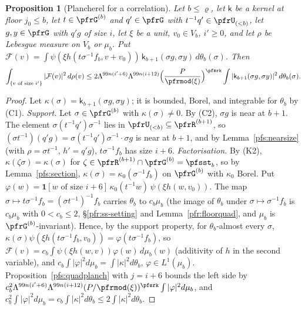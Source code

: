 \documentclass[10pt]{amsart}
\newtheorem{proposition}[theorem]{Proposition}
\theoremstyle{definition}
\theoremstyle{remark}
\begin{document}
\begin{proposition}[Plancherel for a correlation]\label{pfs:corrplanch}
Let $b\le\varrho$, let $\mathsf k$ be a kernel at floor $j_0\le b$, let $t\in\pfrG^{(b)}$ and $q'\in\pfrG$ with
$t^{-1}q'\in\pfrU_{(<b)}$, let $g,y\in\pfrG$ with $q'g$ of size $i$, let $\xi$ be a unit, $v_0\in V_b$, $i'\ge0$, and
let $\rho$ be Lebesgue measure on $V_b$ or $\mu_b$. Put
$\mathcal F(v)=\int\psi(\xi h(t\sigma^{-1}f_b,v+v_0))\,\mathsf k_{b+1}(\sigma g,\sigma y)\,d\theta_b(\sigma)$. Then
\[
\int_{\{v\text{ of size }i'\}}|\mathcal F(v)|^2\,d\rho(v)\le2\Lambda^{99n(i'+6)}\Lambda^{99n(i+12)}\Bigl(\frac
P{\pfrmod(\xi)}\Bigr)^{\pfsrk}\int|\mathsf k_{b+1}(\sigma g,\sigma y)|^2\,d\theta_b(\sigma).
\]
\end{proposition}
\begin{proof}
Let $\kappa(\sigma)=\mathsf k_{b+1}(\sigma g,\sigma y)$; it is bounded, Borel, and integrable for $\theta_b$ by
(C1). \emph{Support.} Let $\sigma\in\pfrG^{(b)}$ with $\kappa(\sigma)\ne0$. By (C2), $\sigma g$ is near at $b+1$. The
element $\sigma(t^{-1}q')\sigma^{-1}$ lies in $\pfrU_{(<b)}\subseteq\pfrR^{(b+1)}$, so
$(\sigma t^{-1})(q'g)=\sigma(t^{-1}q')\sigma^{-1}\cdot\sigma g$ is near at $b+1$, and by Lemma~\ref{pfs:nearsize} (with
$\rho=\sigma t^{-1}$, $h'=q'g$), $t\sigma^{-1}f_b$ has size $i+6$. \emph{Factorisation.} By (K2), $\kappa(\zeta\sigma)=
\kappa(\sigma)$ for $\zeta\in\pfrR^{(b+1)}\cap\pfrG^{(b)}=\pfsst_b$, so by Lemma~\ref{pfs:section}, $\kappa(\sigma)=\kappa_0(
\sigma^{-1}f_b)$ on $\pfrG^{(b)}$ with $\kappa_0$ Borel. Put $\varphi(w)=\mathbf 1[w\text{ of size }i+6]\,\kappa_0(t^{-1}w)\,
\psi(\xi h(w,v_0))$. The map $\sigma\mapsto t\sigma^{-1}f_b=(\sigma t^{-1})^{-1}f_b$ carries $\theta_b$ to $c_b\mu_b$ (the
image of $\theta_b$ under $\sigma\mapsto\sigma^{-1}f_b$ is $c_b\mu_b$ with $0<c_b\le2$, \S\ref{pfr:ss-setting} and
Lemma~\ref{pfr:floorquad}, and $\mu_b$ is $\pfrG^{(b)}$-invariant). Hence, by the
support property, for $\theta_b$-almost every $\sigma$, $\kappa(\sigma)\psi(\xi h(t\sigma^{-1}f_b,v_0))=\varphi(t\sigma^{-1}
f_b)$, so $\mathcal F(v)=c_b\int\psi(\xi h(w,v))\varphi(w)\,d\mu_b(w)$ (additivity of $h$ in the second variable), and
$c_b\int|\varphi|^2d\mu_b=\int|\kappa|^2d\theta_b$, $\varphi\in L^1(\mu_b)$. Proposition~\ref{pfs:quadplanch} with $j=i+6$
bounds the left side by $c_b^2\Lambda^{99n(i'+6)}\Lambda^{99n(i+12)}(P/\pfrmod(\xi))^{\pfsrk}\int|\varphi|^2d\mu_b$, and
$c_b^2\int|\varphi|^2d\mu_b=c_b\int|\kappa|^2d\theta_b\le2\int|\kappa|^2d\theta_b$.
\end{proof}
\end{document}
